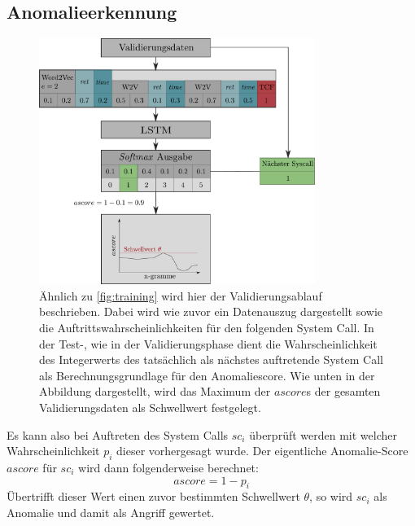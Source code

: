         \subsection{Anomalieerkennung}\label{sec:Anomalieerkennung}
            \begin{figure}[ht]
                \centering
                \includegraphics[width=0.8\textwidth]{images/Validation_overview.pdf}
                \caption[Algorithmus - Ablauf Validierungsphase]{Ähnlich zu \autoref{fig:training} wird hier der Validierungsablauf beschrieben.
                         Dabei wird wie zuvor ein Datenauszug dargestellt sowie die Auftrittswahrscheinlichkeiten für den folgenden System Call.
                         In der Test-, wie in der Validierungsphase dient die Wahrscheinlichkeit des Integerwerts des tatsächlich als nächstes auftretende System Call als Berechnungsgrundlage für den Anomaliescore.
                        Wie unten in der Abbildung dargestellt, wird das Maximum der $ascore$s der gesamten Validierungsdaten als Schwellwert festgelegt.}
                \label{fig:validierung}
            \end{figure}
            Es kann also bei Auftreten des System Calls $sc_i$ überprüft werden mit welcher Wahrscheinlichkeit $p_i$ dieser vorhergesagt wurde.
            Der eigentliche Anomalie-Score $ascore$ für $sc_i$ wird dann folgenderweise berechnet:
            \begin{equation}
                ascore = 1 - p_i
            \end{equation}
            Übertrifft dieser Wert einen zuvor bestimmten Schwellwert $\theta$, so wird $sc_i$ als Anomalie und damit als Angriff gewertet.

